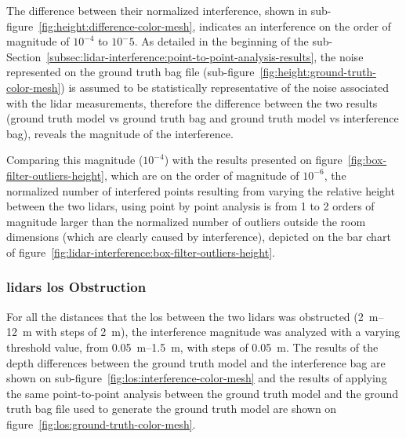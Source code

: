 The difference between their normalized interference, shown in sub-figure~\ref{fig:height:difference-color-mesh}, indicates an interference on the order of magnitude of $10^{-4}$ to $10^-{5}$. As detailed in the beginning of the sub-Section~\ref{subsec:lidar-interference:point-to-point-analysis-results}, the noise represented on the ground truth bag file (sub-figure~\ref{fig:height:ground-truth-color-mesh}) is assumed to be statistically representative of the noise associated with the \ac{lidar} measurements, therefore the difference between the two results (ground truth model vs ground truth bag and ground truth model vs interference bag), reveals the magnitude of the interference. 

Comparing this magnitude ($10^{-4}$) with the results presented on figure~\ref{fig:box-filter-outliers-height}, which are on the order of magnitude of $10^{-6}$, the normalized number of interfered points resulting from varying the relative height between the two \acp{lidar}, using point by point analysis is from 1 to 2 orders of magnitude larger than the normalized number of outliers outside the room dimensions (which are clearly caused by interference), depicted on the bar chart of figure~\ref{fig:lidar-interference:box-filter-outliers-height}.

\subsubsection{\acp{lidar} \acl{los} Obstruction}
For all the distances that the \acf{los} between the two \acp{lidar} was obstructed (\SIrange{2}{12}{\meter} with steps of \SI{2}{\meter}), the interference magnitude was analyzed with a varying threshold value, from \SIrange{0.05}{1.5}{\meter}, with steps of \SI{0.05}{\meter}. The results of the depth differences between the ground truth model and the interference bag are shown on sub-figure~\ref{fig:los:interference-color-mesh} and the results of applying the same point-to-point analysis between the ground truth model and the ground truth bag file used to generate the ground truth model are shown on figure~\ref{fig:los:ground-truth-color-mesh}.

